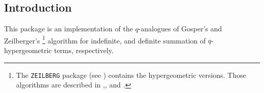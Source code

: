 
{\setcounter{redprompt}{0}}
\newcommand{\redprompt}{\stepcounter{redprompt}\theredprompt:}
\newenvironment{redoutput}{\small\begin{alltt}}{\end{alltt}\vskip-\parskip\noindent{}}


\subsection{Introduction}

\ifdefined{}\else
\newcommand{\qphihyp}[5]{{}_{#1}\phi_{#2}\left.\left[\begin{array}{c}
	#3 \\ #4 \end{array}\right|q,#5\right]}
\newcommand{\qpsihyp}[5]{{}_{#1}\psi_{#2}\left.\left[\begin{array}{c}
	#3 \\ #4 \end{array}\right|q,#5\right]}
\newcommand{\hyp}[5]{{}_{#1}F_{#2}\left.\left[\begin{array}{c}
	#3 \\ #4 \end{array}\right|#5\right]}

\newcommand{\fcn}[2]{{\mathrm #1}(#2)}
\newcommand{\ifcn}[3]{{\mathrm #1}_{#2}(#3)}
\newcommand{\qfac}[2]{\left(#1;\,q\right)_{#2}}
\newcommand{\qbinomial}[2]{{\binom{#1}{#2}\!}_q}
\fi
This package is an implementation of the $q$-analogues of Gosper's
and Zeil\-berger's%
%
\footnote{The \texttt{ZEILBERG} package (see \cite{Koepf:95})
contains the hypergeometric versions. Those algorithms are described in
\cite{Gosper:78},\cite{Zeilberger:91},\cite{Zeilberger:90}
and \cite{Koepf:95e}.}
%
algorithm for indefinite, and definite summation of
$q$-hypergeo\-metric terms, respectively.

